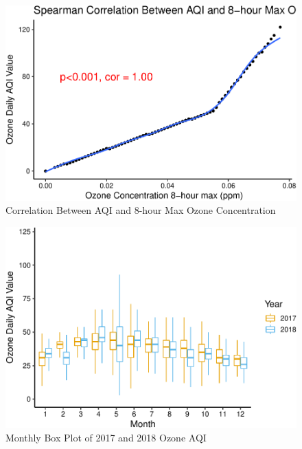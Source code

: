 \documentclass[12pt,]{article}
\begin{document}
\begin{figure}
\centering
\includegraphics{Xia_ENV_872_Project_files/figure-latex/exploration 2-1.pdf}
\caption{Correlation Between AQI and 8-hour Max Ozone Concentration}
\end{figure}

\begin{figure}
\centering
\includegraphics{Xia_ENV_872_Project_files/figure-latex/exploration 3-1.pdf}
\caption{Monthly Box Plot of 2017 and 2018 Ozone AQI}
\end{figure}
\end{document}
